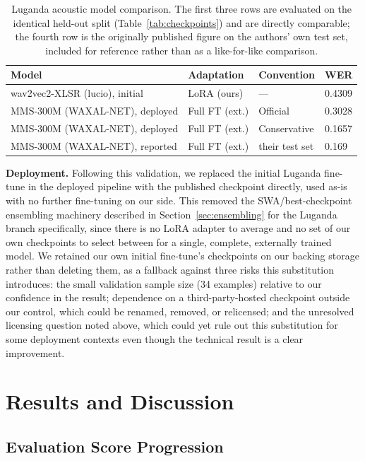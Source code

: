 \documentclass[11pt]{article}
\begin{document}
\begin{table}[htbp]
\centering
\caption{Luganda acoustic model comparison. The first three rows are evaluated on the identical held-out split (Table~\ref{tab:checkpoints}) and are directly comparable; the fourth row is the originally published figure on the authors' own test set, included for reference rather than as a like-for-like comparison.}
\label{tab:luganda-comparison}
\begin{tabular}{llll}
\toprule
Model & Adaptation & Convention & WER \\
\midrule
wav2vec2-XLSR (lucio), initial & LoRA (ours) & --- & 0.4309 \\
MMS-300M (WAXAL-NET), deployed & Full FT (ext.) & Official & 0.3028 \\
MMS-300M (WAXAL-NET), deployed & Full FT (ext.) & Conservative & 0.1657 \\
\midrule
MMS-300M (WAXAL-NET), reported \cite{olufemi2026waxalnet} & Full FT (ext.) & their test set & 0.169 \\
\bottomrule
\end{tabular}
\end{table}

\textbf{Deployment.} Following this validation, we replaced the initial Luganda fine-tune in the deployed pipeline with the published checkpoint directly, used as-is with no further fine-tuning on our side. This removed the SWA/best-checkpoint ensembling machinery described in Section~\ref{sec:ensembling} for the Luganda branch specifically, since there is no LoRA adapter to average and no set of our own checkpoints to select between for a single, complete, externally trained model. We retained our own initial fine-tune's checkpoints on our backing storage rather than deleting them, as a fallback against three risks this substitution introduces: the small validation sample size (34 examples) relative to our confidence in the result; dependence on a third-party-hosted checkpoint outside our control, which could be renamed, removed, or relicensed; and the unresolved licensing question noted above, which could yet rule out this substitution for some deployment contexts even though the technical result is a clear improvement.

\section{Results and Discussion}
\label{sec:results}

\subsection{Evaluation Score Progression}
\end{document}
